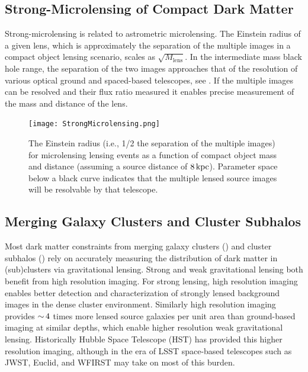 
\subsection{Strong-Microlensing of Compact Dark Matter }
Strong-microlensing is related to astrometric microlensing.
The Einstein radius of a given lens, which is approximately the separation of the multiple images in a compact object lensing scenario, scales as $\sqrt{M_\mathrm{lens}}$.
In the intermediate mass black hole range, the separation of the two images approaches that of the resolution of various optical ground and spaced-based telescopes, see .
If the multiple images can be resolved and their flux ratio measured it enables precise measurement of the mass and distance of the lens.

\begin{figure}
\label{fig:strong_microlensing}
\centering
\texttt{[image: StrongMicrolensing.png]}
\caption{The Einstein radius (i.e., 1/2 the separation of the multiple images) for microlensing lensing events as a function of compact object mass and distance (assuming a source distance of $8\mathrm{\,kpc}$). Parameter space below a black curve indicates that the multiple lensed source images will be resolvable by that telescope. }
\end{figure}

\subsection{Merging Galaxy Clusters and Cluster Subhalos}

Most dark matter constraints from merging galaxy clusters () and cluster subhalos () rely on accurately measuring the distribution of dark matter in (sub)clusters via gravitational lensing.
Strong and weak gravitational lensing both benefit from high resolution imaging.
For strong lensing, high resolution imaging enables better detection and characterization of strongly lensed background images in the dense cluster environment.
Similarly high resolution imaging provides $ {\sim}\,4$ times more lensed source galaxies per unit area than ground-based imaging at similar depths, which enable higher resolution weak gravitational lensing.
Historically Hubble Space Telescope (HST) has provided this higher resolution imaging, although in the era of LSST space-based telescopes such as JWST, Euclid, and WFIRST may take on most of this burden.

